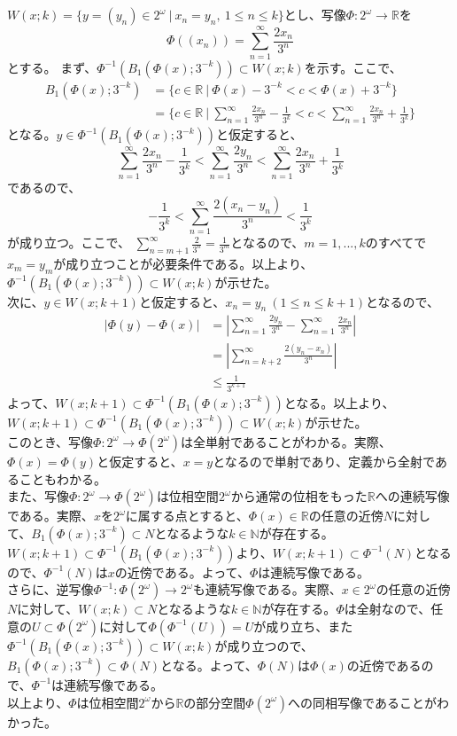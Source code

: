 \documentclass{jsarticle}
\begin{document}
\subsection{}
$W(x;k)=\{y=(y_n)\in 2^\omega\ |\ x_n=y_n, \ 1\leq n\leq k\}$とし、写像$\Phi:2^\omega\to\mathbb{R}$を
\[\Phi((x_n))=\sum_{n=1}^\infty\frac{2x_n}{3^n}\]
とする。
まず、$\Phi^{-1}(B_1(\Phi(x);3^{-k}))\subset W(x;k)$を示す。ここで、
\begin{align*}
B_1(\Phi(x);3^{-k})&=\{c\in\mathbb{R}\ |\ \Phi(x)-3^{-k}<c<\Phi(x)+3^{-k}\}\\
&=\{c\in\mathbb{R}\ |\ \sum_{n=1}^\infty\frac{2x_n}{3^n}-\frac{1}{3^k}<c<\sum_{n=1}^\infty\frac{2x_n}{3^n}+\frac{1}{3^k}\}
\end{align*}
となる。$y\in\Phi^{-1}(B_1(\Phi(x);3^{-k}))$と仮定すると、
\[\sum_{n=1}^\infty\frac{2x_n}{3^n}-\frac{1}{3^k}<\sum_{n=1}^\infty\frac{2y_n}{3^n}<\sum_{n=1}^\infty\frac{2x_n}{3^n}+\frac{1}{3^k}\]
であるので、\[-\frac{1}{3^k}<\sum_{n=1}^\infty\frac{2(x_n-y_n)}{3^n}<\frac{1}{3^k}\]が成り立つ。ここで、
$\sum_{n=m+1}^\infty\frac{2}{3^n}=\frac{1}{3^m}$となるので、$m=1,...,k$のすべてで$x_m=y_m$が成り立つことが必要条件である。以上より、$\Phi^{-1}(B_1(\Phi(x);3^{-k}))\subset W(x;k)$が示せた。\\
次に、$y\in W(x;k+1)$と仮定すると、$x_n=y_n\ (1\leq n\leq k+1)$となるので、
\begin{align*}
|\Phi(y)-\Phi(x)|&=|\sum_{n=1}^{\infty}\frac{2y_n}{3^n}-\sum_{n=1}^{\infty}\frac{2x_n}{3^n}|\\
&=|\sum_{n=k+2}^{\infty}\frac{2(y_n-x_n)}{3^n}|\\
&\leq\frac{1}{3^{k+1}}
\end{align*}
よって、$W(x;k+1)\subset\Phi^{-1}(B_1(\Phi(x);3^{-k}))$となる。以上より、$W(x;k+1)\subset\Phi^{-1}(B_1(\Phi(x);3^{-k}))\subset W(x;k)$が示せた。\\

このとき、写像$\Phi:2^\omega\to\Phi(2^\omega)$は全単射であることがわかる。実際、$\Phi(x)=\Phi(y)$と仮定すると、$x=y$となるので単射であり、定義から全射であることもわかる。\\
また、写像$\Phi:2^\omega\to\Phi(2^\omega)$は位相空間$2^\omega$から通常の位相をもった$\mathbb{R}$への連続写像である。実際、$x$を$2^\omega$に属する点とすると、$\Phi(x)\in\mathbb{R}$の任意の近傍$N$に対して、$B_1(\Phi(x);3^{-k})\subset N$となるような$k\in\mathbb{N}$が存在する。$W(x;k+1)\subset\Phi^{-1}(B_1(\Phi(x);3^{-k}))$より、$W(x;k+1)\subset \Phi^{-1}(N)$となるので、$\Phi^{-1}(N)$は$x$の近傍である。よって、$\Phi$は連続写像である。\\
さらに、逆写像$\Phi^{-1}:\Phi(2^\omega)\to2^\omega$も連続写像である。実際、$x\in2^\omega$の任意の近傍$N$に対して、$W(x;k)\subset N$となるような$k\in\mathbb{N}$が存在する。$\Phi$は全射なので、任意の$U\subset\Phi(2^\omega)$に対して$\Phi(\Phi^{-1}(U))=U$が成り立ち、また$\Phi^{-1}(B_1(\Phi(x);3^{-k}))\subset W(x;k)$が成り立つので、$B_1(\Phi(x);3^{-k})\subset \Phi(N)$となる。よって、$\Phi(N)$は$\Phi(x)$の近傍であるので、$\Phi^{-1}$は連続写像である。\\
以上より、$\Phi$は位相空間$2^\omega$から$\mathbb{R}$の部分空間$\Phi(2^\omega)$への同相写像であることがわかった。
\end{document}
